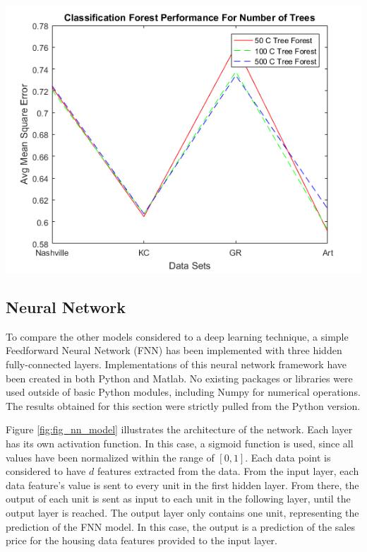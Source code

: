 \documentclass[10pt]{article}
\begin{document}
\begin{multicols}{2}
		\begin{center}
		\captionsetup{type=figure}
			\includegraphics[scale=0.6]{Images/ClassificationGraphPerformanceForNumberOfTrees} \\
			\label{fig:c_forest_treenum_perf}
		\end{center}
		
		\subsection{Neural Network}

		To compare the other models considered to a deep learning technique, a simple Feedforward Neural Network (FNN) has been implemented with three hidden fully-connected layers. Implementations of this neural network framework have been created in both Python and Matlab. No existing packages or libraries were used outside of basic Python modules, including Numpy for numerical operations. The results obtained for this section were strictly pulled from the Python version.
		
		Figure \ref{fig:fig_nn_model} illustrates the architecture of the network. Each layer has its own activation function. In this case, a sigmoid function is used, since all values have been normalized within the range of \([0, 1]\). Each data point is considered to have \(d\) features extracted from the data. From the input layer, each data feature's value is sent to every unit in the first hidden layer. From there, the output of each unit is sent as input to each unit in the following layer, until the output layer is reached. The output layer only contains one unit, representing the prediction of the FNN model. In this case, the output is a prediction of the sales price for the housing data features provided to the input layer.
		

\end{multicols}
\end{document}
